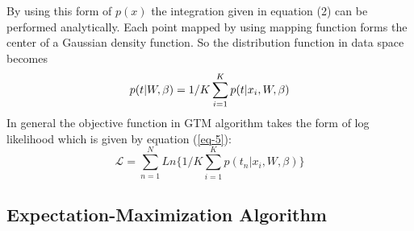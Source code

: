 \documentclass[a4paper]{article}
\begin{document}
By using this form of $p(x)$ the integration given in equation (2) can be performed analytically. Each point mapped by using mapping function forms the center of a Gaussian density function. So the distribution function in data space becomes 
\begin{equation}
p(t|W,\beta)=1/K \sum\limits_{i=1}^{K} p(t|x_{i},W,\beta) \label{eq-4}\\
\end{equation}
In general the objective function in GTM algorithm takes the form of log likelihood which is given by equation (\ref{eq-5}):
\begin{equation}
\mathcal{L}= \sum\limits_{n=1}^{N} Ln\{1/K \sum\limits_{i=1}^{K} p(t_{n}|x_{i},W,\beta)\} \label{eq-5}
\end{equation}

\subsection{Expectation-Maximization Algorithm}
\end{document}
